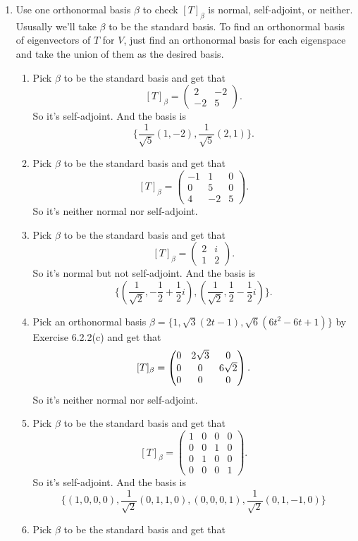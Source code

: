 \begin{enumerate}
\begin{enumerate}
\end{enumerate}
\item Use one orthonormal basis $\beta $ to check $[T]_{\beta}$ is normal, self-adjoint, or neither. Ususally we'll take $\beta$ to be the standard basis. To find an orthonormal basis of eigenvectors of $T$ for $V$, just find an orthonormal basis for each eigenspace and take the union of them as the desired basis.
\begin{enumerate}
\item Pick $\beta$ to be the standard basis and get that 
\[[T]_{\beta}=\begin{pmatrix}2&-2\\-2&5\end{pmatrix}.\]
So it's self-adjoint. And the basis is 
\[\{\frac{1}{\sqrt{5}}(1,-2),\frac{1}{\sqrt{5}}(2,1)\}.\]
\item Pick $\beta$ to be the standard basis and get that 
\[[T]_{\beta}=\begin{pmatrix}-1&1&0\\0&5&0\\4&-2&5\end{pmatrix}.\]
So it's neither normal nor self-adjoint.
\item Pick $\beta$ to be the standard basis and get that 
\[[T]_{\beta}=\begin{pmatrix}2&i\\1&2\end{pmatrix}.\]
So it's normal but not self-adjoint. And the basis is 
\[\{(\frac{1}{\sqrt{2}},-\frac{1}{2}+\frac{1}{2}i),(\frac{1}{\sqrt{2}},\frac{1}{2}-\frac{1}{2}i)\}.\]
\item Pick an orthonormal basis $\beta =\{1,\sqrt{3}(2t-1),\sqrt{6}(6t^2-6t+1)\}$ by Exercise 6.2.2(c) and get that 
\[[T]_{\beta}=\begin{pmatrix}0 & 2\sqrt{3} & 0\cr 0 & 0 & 6\sqrt{2}\cr 0 & 0 & 0\end{pmatrix}.\]
So it's neither normal nor self-adjoint.
\item Pick $\beta$ to be the standard basis and get that 
\[[T]_{\beta}=\begin{pmatrix}1&0&0&0\\0&0&1&0\\0&1&0&0\\0&0&0&1\end{pmatrix}.\]
So it's self-adjoint. And the basis is 
\[\{(1,0,0,0),\frac{1}{\sqrt{2}}(0,1,1,0),(0,0,0,1),\frac{1}{\sqrt{2}}(0,1,-1,0)\}\]
\item Pick $\beta$ to be the standard basis and get that 

\end{enumerate}
\end{enumerate}
